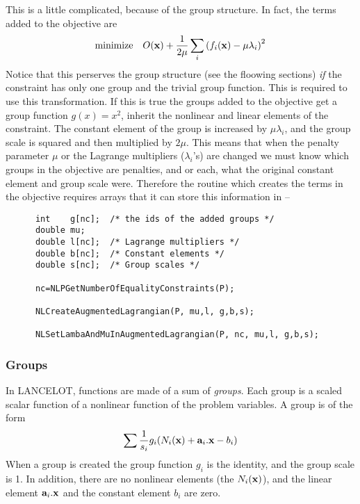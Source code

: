 \documentclass[12pt]{article}
\begin{document}
    This is a little complicated, because of the group structure. In fact, the terms added to the objective are
    \begin{displaymath}
      {\rm minimize}\quad O({\bf x}) + {1\over{2\mu}}\sum_i \left( f_i({\bf x})-\mu\lambda_i\right)^2
    \end{displaymath}
    Notice that this perserves the group structure (see the floowing sections) {\it if} the constraint has
    only one group and the trivial group function. This is required to use this transformation. If this is
    true the groups added to the objective get a group function $g(x)=x^2$,
    inherit the nonlinear and linear elements of the constraint. The constant element of the group
    is increased by $\mu\lambda_i$, and the group scale is squared and then multiplied by $2\mu$. This
    means that when the penalty parameter $\mu$ or the Lagrange multipliers ($\lambda_i$'s) are changed 
    we must know which groups in the objective are penalties, and or each, what the original constant
    element and group scale were. Therefore the routine which creates the terms in the objective 
    requires arrays that it can store this information in --
    \begin{verbatim}
      int    g[nc];  /* the ids of the added groups */
      double mu;
      double l[nc];  /* Lagrange multipliers */
      double b[nc];  /* Constant elements */
      double s[nc];  /* Group scales */

      nc=NLPGetNumberOfEqualityConstraints(P);

      NLCreateAugmentedLagrangian(P, mu,l, g,b,s);

      NLSetLambaAndMuInAugmentedLagrangian(P, nc, mu,l, g,b,s);
    \end{verbatim}

   \subsubsection{Groups}
     In LANCELOT, functions are made of a sum of {\it groups}. Each group is a scaled scalar function of a nonlinear
     function of the problem variables. A group is of the form
     \begin{displaymath}
      \sum {1\over{s_i}}g_i(N_i({\bf x})+ {\bf a}_i.{\bf x}-b_i)
     \end{displaymath}
     When a group is created the group function $g_i$ is the identity, and the group scale is 1. In addition, there are no
     nonlinear elements (the $N_i({\bf x})$), and the linear element ${\bf a}_i.{\bf x}$ and the constant element
     $b_i$ are zero. 
\end{document}
